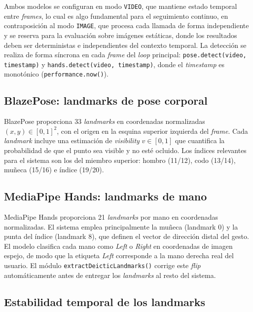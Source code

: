 \documentclass[12pt]{report} %
\begin{document}
Ambos modelos se configuran en modo \texttt{VIDEO}, que mantiene estado temporal entre \textit{frames}, lo cual es algo fundamental para el seguimiento continuo, en contraposición al modo \texttt{IMAGE}, que procesa cada llamada de forma independiente y se reserva para la evaluación sobre imágenes estáticas, donde los resultados deben ser deterministas e independientes del contexto temporal. La detección se realiza de forma síncrona en cada \textit{frame} del \textit{loop} principal: \texttt{pose.detect(video, timestamp)} y \texttt{hands.detect(video, timestamp)}, donde el \textit{timestamp} es monotónico (\texttt{performance.now()}).

\subsection{BlazePose: landmarks de pose corporal}

BlazePose \citep{bazarevsky2020blazepose} proporciona 33 \textit{landmarks} en coordenadas normalizadas $(x, y) \in [0,1]^2$, con el origen en la esquina superior izquierda del \textit{frame}. Cada \textit{landmark} incluye una estimación de \textit{visibility} $v \in [0,1]$ que cuantifica la probabilidad de que el punto sea visible y no esté ocluido. Los índices relevantes para el sistema son los del miembro superior: hombro (11/12), codo (13/14), muñeca (15/16) e índice (19/20).

\subsection{MediaPipe Hands: landmarks de mano}

MediaPipe Hands \citep{zhang2020mediapipe} proporciona 21 \textit{landmarks} por mano en coordenadas normalizadas. El sistema emplea principalmente la muñeca (landmark 0) y la punta del índice (landmark 8), que definen el vector de dirección distal del gesto. El modelo clasifica cada mano como \textit{Left} o \textit{Right} en coordenadas de imagen espejo, de modo que la etiqueta \textit{Left} corresponde a la mano derecha real del usuario. El módulo \texttt{extractDeicticLandmarks()} corrige este \textit{flip} automáticamente antes de entregar los \textit{landmarks} al resto del sistema.

\subsection{Estabilidad temporal de los landmarks}
\label{sec:estabilidad}
\end{document}
